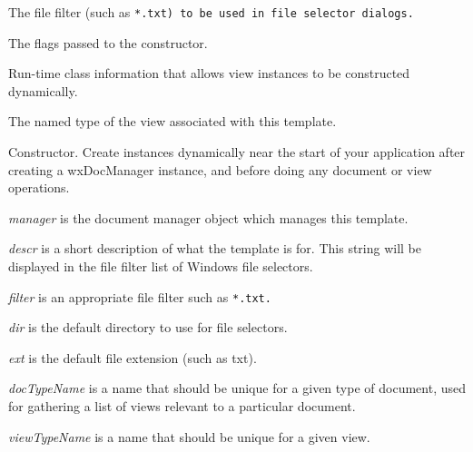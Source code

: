 
The file filter (such as \tt{*.txt}) to be used in file selector dialogs.



The flags passed to the constructor.



Run-time class information that allows view instances to be constructed dynamically.



The named type of the view associated with this template.



Constructor. Create instances dynamically near the start of your application after creating
a wxDocManager instance, and before doing any document or view operations.

{\it manager} is the document manager object which manages this template.

{\it descr} is a short description of what the template is for. This string will be displayed in the
file filter list of Windows file selectors.

{\it filter} is an appropriate file filter such as \tt{*.txt}.

{\it dir} is the default directory to use for file selectors.

{\it ext} is the default file extension (such as txt).

{\it docTypeName} is a name that should be unique for a given type of document, used for
gathering a list of views relevant to a particular document.

{\it viewTypeName} is a name that should be unique for a given view.


